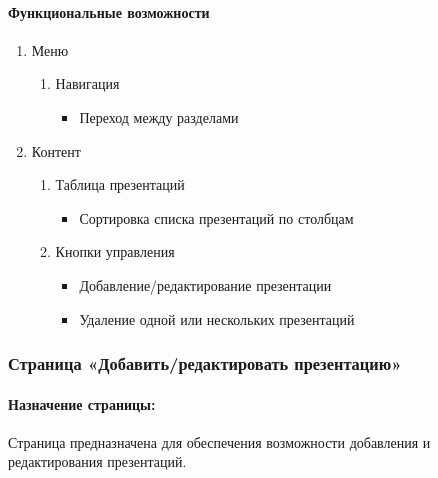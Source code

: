 \paragraph{Функциональные возможности}
\begin{enumerate}
	\item Меню
	\begin{enumerate}
		\item Навигация
		\begin{itemize}
			\item Переход между разделами
		\end{itemize}
	\end{enumerate}

	\item Контент
	\begin{enumerate}
		\item Таблица презентаций
		\begin{itemize}
			\item Сортировка списка презентаций по столбцам
		\end{itemize}

		\item Кнопки управления
		\begin{itemize}
			\item Добавление/редактирование презентации
			\item Удаление одной или нескольких презентаций
		\end{itemize}
	\end{enumerate}
\end{enumerate}


\subsubsection{Страница «Добавить/редактировать презентацию»}
\paragraph{Назначение страницы:} Страница предназначена для обеспечения возможности добавления и редактирования презентаций.

